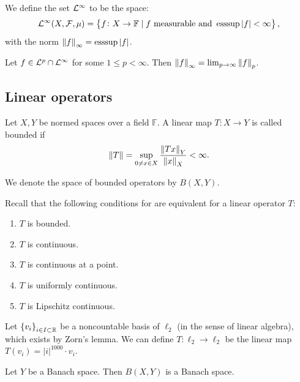 \documentclass[11pt,a4paper]{article}
\begin{document}
\begin{definition}[$\L^{\infty}$]
  We define the set $\L^{\infty}$ to be the space:
  \[
    \mathcal{L}^{\infty}(X,\mathcal F,\mu) =
    \left\{f \colon X \to \mathbb F \mid
      f\text{ measurable and } \operatorname{esssup}|f| < \infty\right\},
  \]
  with the norm $\left\lVert f\right\rVert_{\infty} = \operatorname{esssup} |f|$.
\end{definition}

\begin{exercise}
  Let $f \in \mathcal{L}^{p} \cap \mathcal{L}^{\infty}$ for some $1 \le p < \infty$.
  Then $\left\lVert f\right\rVert_{\infty} = \lim_{p \to \infty} \left\lVert f\right\rVert_p$.
\end{exercise}

\subsection{Linear operators}

\begin{definition}
  Let $X,Y$ be normed spaces over a field $\mathbb F$.
  A linear map $T \colon X \to Y$ is called bounded
  if
  \[
    \left\lVert T\right\rVert =
    \sup_{0 \neq x \in X} \frac{\left\lVert Tx\right\rVert_Y}{\left\lVert x\right\rVert_X} < \infty.
  \]
\end{definition}
\begin{remark}
  We denote the space of bounded operators by $B(X,Y)$.
\end{remark}
\begin{remark}
  Recall that the following conditions
  for are equivalent for a linear operator $T$:
  \begin{enumerate}
    \item[(1)] $T$ is bounded.
    \item[(2)] $T$ is continuous.
    \item[(3)] $T$ is continuous at a point.
    \item[(4)] $T$ is uniformly continuous.
    \item[(5)] $T$ is Lipschitz continuous.
  \end{enumerate}
\end{remark}

\begin{example}
  Let $\left\{v_i\right\}_{i \in I \subset \mathbb{R}}$ be a noncountable basis of $\ell_2$
  (in the sense of linear algebra), which exists by Zorn's lemma.
  We can define $T \colon \ell_2 \to \ell_2$ be the linear map
  $T(v_i) = |i|^{1000} \cdot v_i$.
\end{example}

\begin{proposition}
  Let $Y$ be a Banach space.
  Then $B(X,Y)$ is a Banach space.
\end{proposition}
\end{document}
